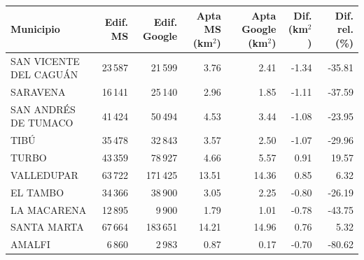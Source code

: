 \begin{tabular}{lrrrrrr}
\toprule
Municipio & Edif. MS & Edif. Google & Apta MS (km$^2$) & Apta Google (km$^2$) & Dif. (km$^2$) & Dif. rel. (\%) \\
\midrule
SAN VICENTE DEL CAGUÁN & 23\,587 & 21\,599 & 3.76 & 2.41 & -1.34 & -35.81 \\
SARAVENA & 16\,141 & 25\,140 & 2.96 & 1.85 & -1.11 & -37.59 \\
SAN ANDRÉS DE TUMACO & 41\,424 & 50\,494 & 4.53 & 3.44 & -1.08 & -23.95 \\
TIBÚ & 35\,478 & 32\,843 & 3.57 & 2.50 & -1.07 & -29.96 \\
TURBO & 43\,359 & 78\,927 & 4.66 & 5.57 & 0.91 & 19.57 \\
VALLEDUPAR & 63\,722 & 171\,425 & 13.51 & 14.36 & 0.85 & 6.32 \\
EL TAMBO & 34\,366 & 38\,900 & 3.05 & 2.25 & -0.80 & -26.19 \\
LA MACARENA & 12\,895 & 9\,900 & 1.79 & 1.01 & -0.78 & -43.75 \\
SANTA MARTA & 67\,664 & 183\,651 & 14.21 & 14.96 & 0.76 & 5.32 \\
AMALFI & 6\,860 & 2\,983 & 0.87 & 0.17 & -0.70 & -80.62 \\
\bottomrule
\end{tabular}
